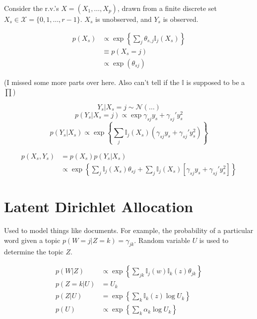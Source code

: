 \documentclass[11pt]{article}
\newcommand{\X}{\mathcal{X}}
\newcommand{\I}{\mathbb{I}}
\begin{document}
Consider the r.v.'s $X = (X_1, \ldots, X_p)$, drawn from a finite discrete set $X_s \in \X = \{0, 1, \ldots, r-1\}$. $X_s$ is unobserved, and $Y_s$ is observed. 

\begin{align}
p(X_s) 
& \propto \exp \left \{ \sum_j \theta_{s,j} \I_j(X_s) \right \} \\
& \equiv p(X_s = j) \\
& \propto \exp(\theta_{sj})
\end{align}

(I missed some more parts over here. Also can't tell if the $\I$ is supposed to be a $\prod$)

$$Y_s | X_s = j \sim \mathcal N(\ldots)$$
$$ p(Y_s | X_s = j) \propto \exp {\gamma_{sj} y_s + \gamma_{sj}' y_s^2} $$
$$ p(Y_s|X_s) \propto \exp \left \{ \sum_j \I_j (X_s) (\gamma_{sj} y_s + \gamma_{sj}' y_s^2)  \right \}$$

\begin{align}
p(X_s, Y_s) 
& = p(X_s) p (Y_s | X_s) \\
& \propto \exp \left \{ \sum_j \I_j (X_s) \theta_{sj} + \sum_j \I_j (X_s) \left [  \gamma_{sj} y_s + \gamma_{sj}' y_s^2 \right ]  \right \}
\end{align}

\section{Latent Dirichlet Allocation}

Used to model things like documents. For example, the probability of a particular word given a topic $p(W=j|Z=k) = \gamma_{jk}$. Random variable $U$ is used to determine the topic $Z$. 

\begin{align}
p(W|Z) & \propto \exp \left \{  \sum_{jk} \I_{j} (w) \I_k (z) \theta_{jk}   \right \} \\
p(Z = k | U) & = U_k \\
p(Z|U) & = \exp \left \{ \sum_k \I_k (z) \log U_k  \right \} \\
p(U) & \propto  \exp \left \{ \sum_k \alpha_k \log U_k  \right \} 
\end{align}
\end{document}
